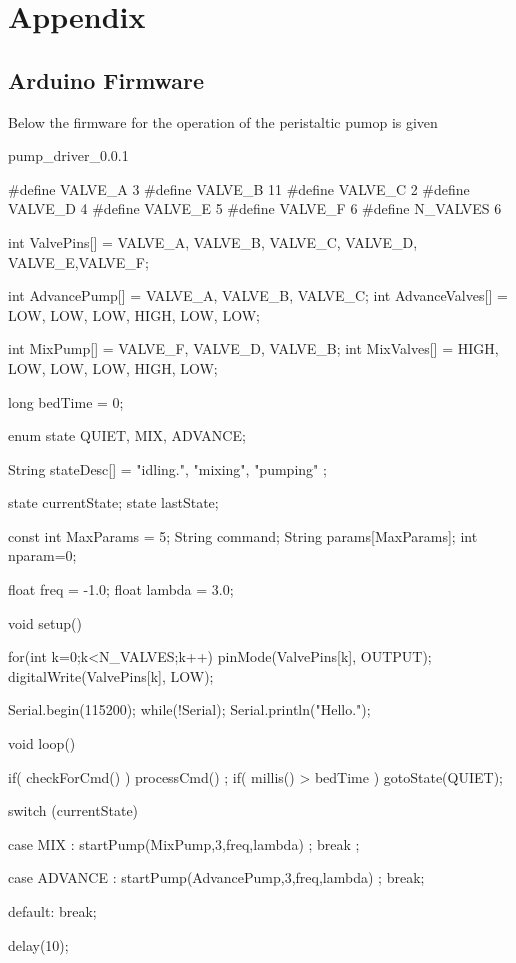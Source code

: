 

\chapter{Appendix} \label{Chapter:Appendix}

\section{Arduino Firmware}

Below the firmware for the operation of the peristaltic pumop is given

pump_driver_0.0.1

#define VALVE_A 3
#define VALVE_B 11
#define VALVE_C 2
#define VALVE_D 4
#define VALVE_E 5
#define VALVE_F 6
#define N_VALVES 6

int ValvePins[] = {VALVE_A, VALVE_B, VALVE_C, VALVE_D, VALVE_E,VALVE_F};

int AdvancePump[] = {VALVE_A, VALVE_B, VALVE_C};
int AdvanceValves[] = {LOW, LOW, LOW, HIGH, LOW, LOW};

int MixPump[] = {VALVE_F, VALVE_D, VALVE_B};
int MixValves[] = {HIGH, LOW, LOW, LOW, HIGH, LOW};


long bedTime = 0;


enum state  {QUIET, MIX, ADVANCE};

String stateDesc[] = {"idling.", "mixing", "pumping"} ;

state currentState;
state lastState;

const int MaxParams = 5;
String command;
String params[MaxParams];
int nparam=0;

float  freq = -1.0;
float lambda = 3.0;

void setup() {

  for(int k=0;k<N_VALVES;k++)
    {
      pinMode(ValvePins[k], OUTPUT);
      digitalWrite(ValvePins[k], LOW);
    }

   Serial.begin(115200);
   while(!Serial);
   Serial.println("Hello.");
}

void loop() {
  if( checkForCmd() ) processCmd()  ;
  if( millis() > bedTime ) gotoState(QUIET);

  switch (currentState) {
    case MIX :
      startPump(MixPump,3,freq,lambda) ;
      break ;

    case ADVANCE :
      startPump(AdvancePump,3,freq,lambda) ;
      break;

    default:
      break;
  }

  delay(10);
}


